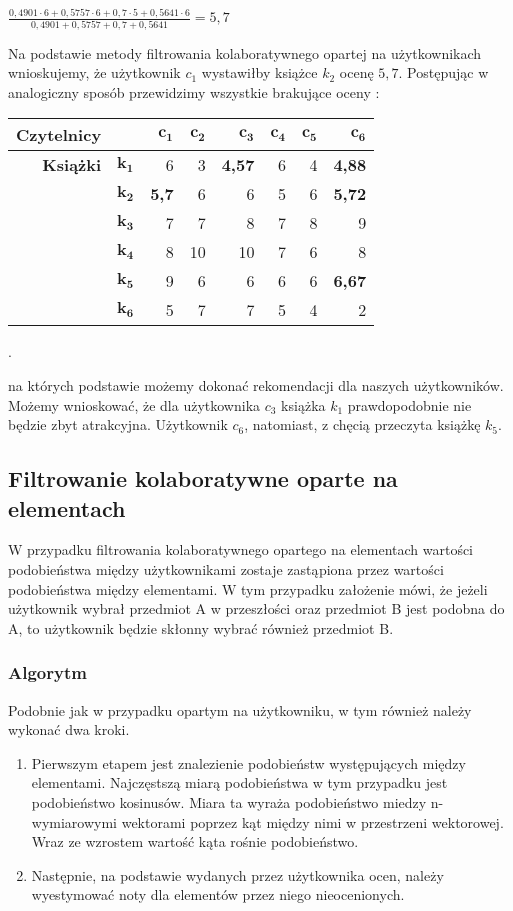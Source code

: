 \documentclass[12pt,a4paper]{report}
\begin{document}
\begin{center}
$\frac{0,4901 \cdot 6 + 0,5757 \cdot 6 + 0,7 \cdot 5 + 0,5641 \cdot 6}{0,4901 + 0,5757  + 0,7  + 0,5641} = 5,7$
\end{center}
Na podstawie metody filtrowania kolaboratywnego opartej na użytkownikach wnioskujemy, że użytkownik $c_1$ wystawiłby książce $k_2$ ocenę $5,7$.
Postępując w analogiczny sposób przewidzimy wszystkie brakujące oceny :
\begin{center}
\begin{tabular}{|r|r|r|r|r|r|r|r|} \hline
\textbf{Czytelnicy} & & $\mathbf{c_1}$ & $\mathbf{c_2}$ & $\mathbf{c_3}$ & $\mathbf{c_4}$ & $\mathbf{c_5}$ & $\mathbf{c_6}$ \\
\hline
\hline
\textbf{Książki} &$\mathbf{k_1}$ & 6 & 3 & \textbf{4,57} & 6 & 4 & \textbf{4,88} \\
\hline
&$\mathbf{k_2}$ & \textbf{5,7} & 6 & 6 & 5 & 6 & \textbf{5,72} \\
\hline
&$\mathbf{k_3}$ & 7 & 7 & 8 & 7 & 8 & 9 \\
\hline
&$\mathbf{k_4}$ & 8 & 10 & 10 & 7 & 6 & 8 \\
\hline
&$\mathbf{k_5}$ & 9 & 6 & 6 & 6 & 6 & \textbf{6,67}  \\
\hline
&$\mathbf{k_6}$ & 5 & 7 & 7 & 5 & 4 & 2 \\
\hline
\end{tabular}.
\end{center}
na których podstawie możemy dokonać rekomendacji dla naszych użytkowników.
Możemy wnioskować, że dla użytkownika $c_3$ książka $k_1$ prawdopodobnie nie będzie zbyt atrakcyjna. Użytkownik $c_6$, natomiast, z chęcią przeczyta książkę $k_5$. 
\subsection{Filtrowanie kolaboratywne oparte na  elementach}
W przypadku filtrowania kolaboratywnego opartego na elementach wartości podobieństwa między użytkownikami zostaje zastąpiona przez  wartości podobieństwa między elementami.
W tym przypadku założenie mówi, że jeżeli użytkownik wybrał przedmiot A w przeszłości oraz przedmiot B jest podobna do A, to użytkownik będzie skłonny wybrać również przedmiot B.
\subsubsection{Algorytm}
Podobnie jak w przypadku opartym na użytkowniku, w tym również należy wykonać dwa kroki.
\begin{enumerate}
\item Pierwszym etapem jest znalezienie podobieństw występujących między elementami. Najczęstszą miarą podobieństwa w tym przypadku jest podobieństwo kosinusów. Miara ta wyraża podobieństwo miedzy n-wymiarowymi wektorami poprzez kąt między nimi w przestrzeni wektorowej. Wraz ze wzrostem wartość kąta rośnie podobieństwo.
\item Następnie, na podstawie wydanych przez użytkownika ocen, należy wyestymować noty dla elementów przez niego nieocenionych.
\end{enumerate}
\end{document}
